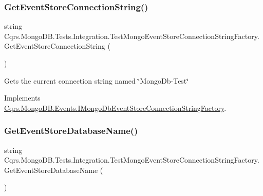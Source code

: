 \subsubsection{\texorpdfstring{Get\+Event\+Store\+Connection\+String()}{GetEventStoreConnectionString()}}
{\footnotesize\ttfamily string Cqrs.\+Mongo\+D\+B.\+Tests.\+Integration.\+Test\+Mongo\+Event\+Store\+Connection\+String\+Factory.\+Get\+Event\+Store\+Connection\+String (\begin{DoxyParamCaption}{ }\end{DoxyParamCaption})}



Gets the current connection string named \char`\"{}\+Mongo\+Db-\/\+Test\char`\"{} 



Implements \hyperlink{interfaceCqrs_1_1MongoDB_1_1Events_1_1IMongoDbEventStoreConnectionStringFactory_a3860ea4bf6793b081f03fb7cc1dcbb27_a3860ea4bf6793b081f03fb7cc1dcbb27}{Cqrs.\+Mongo\+D\+B.\+Events.\+I\+Mongo\+Db\+Event\+Store\+Connection\+String\+Factory}.

\mbox{\label{classCqrs_1_1MongoDB_1_1Tests_1_1Integration_1_1TestMongoEventStoreConnectionStringFactory_adbefedfb3bea3521f72333ce47575301_adbefedfb3bea3521f72333ce47575301}} 
\subsubsection{\texorpdfstring{Get\+Event\+Store\+Database\+Name()}{GetEventStoreDatabaseName()}}
{\footnotesize\ttfamily string Cqrs.\+Mongo\+D\+B.\+Tests.\+Integration.\+Test\+Mongo\+Event\+Store\+Connection\+String\+Factory.\+Get\+Event\+Store\+Database\+Name (\begin{DoxyParamCaption}{ }\end{DoxyParamCaption})}



